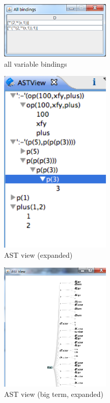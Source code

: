 \begin{figure}
  \includegraphics[width=200px]{images/plugin8.png}
  \caption{all variable bindings}\label{fig:plugin8}
\end{figure}

\begin{figure}
  \includegraphics[width=200px]{images/plugin9.png}
  \caption{AST view (expanded)}\label{fig:plugin9}
\end{figure}

\begin{figure}
  \includegraphics[width=200px]{images/plugin10.png}
  \caption{AST view (big term, expanded)}\label{fig:plugin10}
\end{figure}


